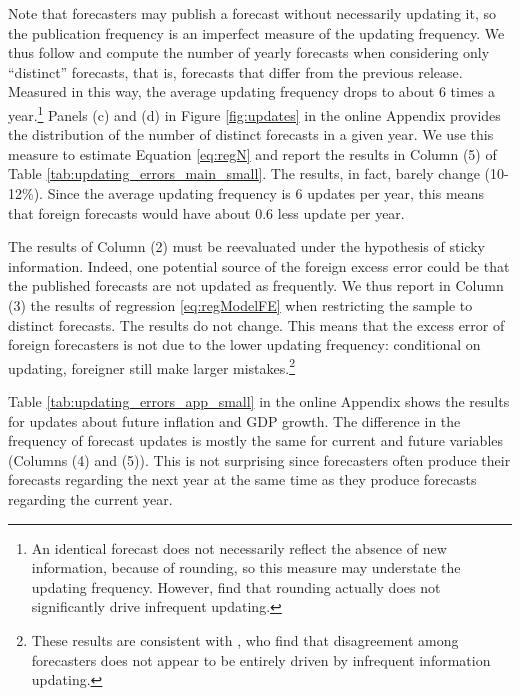 Note that forecasters may publish a forecast without necessarily updating it, so the publication frequency is an imperfect measure of the updating frequency. We thus follow \citet{Andrade2013} and compute the number of yearly forecasts when considering only ``distinct'' forecasts, that is, forecasts that differ from the previous release. Measured in this way, the average updating frequency drops to about 6 times a year.\footnote{An identical forecast does not necessarily reflect the absence of new information, because of rounding, so this measure may understate the updating frequency. However, \citet{Andrade2013} find that rounding actually does not significantly drive infrequent updating.} Panels (c) and (d) in Figure \ref{fig:updates} in the online Appendix provides the distribution of the number of distinct forecasts in a given year. We use this measure to estimate Equation \eqref{eq:regN} and report the results in Column (5) of Table \ref{tab:updating_errors_main_small}. The results, in fact, barely change (10-12\%). Since the average updating frequency is 6 updates per year, this means that foreign forecasts would have about 0.6 less update per year.

The results of Column (2) must be reevaluated under the hypothesis of sticky information. Indeed, one potential source of the foreign excess error could be that the published forecasts are not updated as frequently. We thus report in Column (3) the results of regression \eqref{eq:regModelFE} when restricting the sample to distinct forecasts. The results do not change. This means that the excess error of foreign forecasters is not due to the lower updating frequency: conditional on updating, foreigner still make larger mistakes.\footnote{These results are consistent with \citet{Andrade2013}, who find that disagreement among forecasters does not appear to be entirely driven by infrequent information updating.}

Table \ref{tab:updating_errors_app_small} in the online Appendix shows the results for updates about future inflation and GDP growth. The difference in the frequency of forecast updates is mostly the same for current and future variables (Columns (4) and (5)). This is not surprising since forecasters often produce their forecasts regarding the next year at the same time as they produce forecasts regarding the current year. 